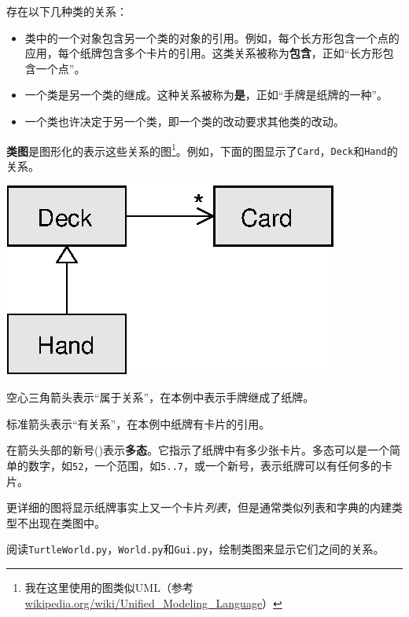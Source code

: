 存在以下几种类的关系：

\begin{itemize}

\item 类中的一个对象包含另一个类的对象的引用。例如，每个长方形包含一个点的应用，每个纸牌包含多个卡片的引用。这类关系被称为{\bf 包含}，正如“长方形包含一个点”。

\item 一个类是另一个类的继成。这种关系被称为{\bf 是}，正如“手牌是纸牌的一种”。

\item 一个类也许决定于另一个类，即一个类的改动要求其他类的改动。

\end{itemize}


{\bf 类图}是图形化的表示这些关系的图\footnote{我在这里使用的图类似UML（参考\url{wikipedia.org/wiki/Unified_Modeling_Language}）}。例如，下面的图显示了{\tt Card}，{\tt Deck}和{\tt Hand}的关系。

\beforefig
\centerline{\includegraphics{figs/class1.eps}}
\afterfig

空心三角箭头表示“属于关系”，在本例中表示手牌继成了纸牌。

标准箭头表示“有关系”，在本例中纸牌有卡片的引用。


在箭头头部的新号({\tt *})表示{\bf 多态}。它指示了纸牌中有多少张卡片。多态可以是一个简单的数字，如{\tt 52}，一个范围，如{\tt 5..7}，或一个新号，表示纸牌可以有任何多的卡片。

更详细的图将显示纸牌事实上又一个卡片{\em 列表}，但是通常类似列表和字典的内建类型不出现在类图中。

\begin{ex}
阅读{\tt TurtleWorld.py}，{\tt World.py}和{\tt Gui.py}，绘制类图来显示它们之间的关系。
\end{ex}


